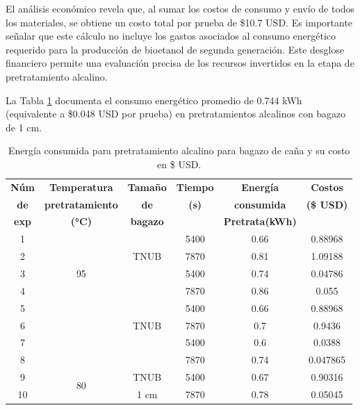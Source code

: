 \documentclass[12pt]{article}
\begin{document}
	El análisis económico revela que, al sumar los costos de consumo y envío de todos los materiales, se obtiene un costo total por prueba de \$10.7 USD. Es importante señalar que este cálculo no incluye los gastos asociados al consumo energético requerido para la producción de bioetanol de segunda generación. Este desglose financiero permite una evaluación precisa de los recursos invertidos en la etapa de pretratamiento alcalino.
	
	La Tabla \ref{tabla costo 1 cm} documenta el consumo energético promedio de 0.744 kWh (equivalente a \$0.048 USD por prueba) en pretratamientos alcalinos con bagazo de 1 cm.
	
	
	
	\begin{table}[H]
		\centering
		\caption{Energía consumida para pretratamiento alcalino para bagazo de caña y su costo en \$ USD. }
		\label{tabla costo 1 cm}
		\setlength{\tabcolsep}{2.5pt}
			\begin{tabular}{|c|c|c|c|c|c|}
				\hline
				\textbf{Núm}&\textbf{Temperatura } & \textbf{Tamaño } & \textbf{Tiempo} & \textbf{Energía} & \textbf{Costos } \\ 
			\textbf{ de}	&\textbf{pretratamiento } &	\textbf{ de}  &	\textbf{ (s)} & 	\textbf{ consumida }& 	\textbf{(\$ USD)} \\ 
			\textbf{exp}	&\textbf{(°C)} &	\textbf{ bagazo}  &	 & 	\textbf{ Pretrata(kWh) }& 	 \\ \hline
			
			
			1&	\multirow{5}{*}{95} & \multirow{3}{*}{TNUB} & 5400 &0.66  & 0.88968  \\  \cline{4-6} \cline{1-1}
			2&                     	&                       & 7870 &0.81 & 1.09188  \\ \cline{3-6} \cline{1-1}
			3&                     	& \multirow{3}{*}{1 cm} & 5400 &0.74 & 0.04786  \\  \cline{4-6} \cline{1-1}
			4&                   	&                       & 7870 & 0.86 & 0.055  \\  \hline 
			5&\multirow{5}{*}{90}   & \multirow{3}{*}{TNUB} & 5400 & 0.66  &0.88968  \\  \cline{4-6} \cline{1-1}
			6&                  	&                       & 7870 & 0.7  &  0.9436  \\ 	\cline{3-6} \cline{1-1}
			7&                  	& \multirow{2}{*}{1 cm} & 5400 & 0.6& 0.0388   \\  \cline{4-6} \cline{1-1}
			8&	                    &                       & 7870 & 0.74 & 0.047865\\   \hline
			9&	\multirow{2}{*}{80} & TNUB                  & 5400 &  0.67 & 0.90316  \\  \cline{3-6} \cline{1-1}
			10&	                    & 1 cm                  & 7870 & 0.78 & 0.05045 \\ \hline
		\end{tabular}
		
	\end{table}
	
\end{document}
